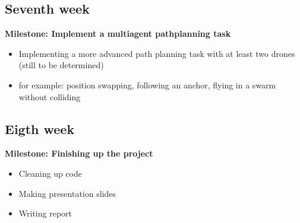 \documentclass{article}
\begin{document}
\subsection{Seventh week}
\textbf{Milestone: Implement a multiagent pathplanning task}
\begin{itemize}
    \item Implementing a more advanced path planning task with at least two drones (still to be determined)
    \item for example: position swapping, following an anchor, flying in a swarm without colliding
\end{itemize}

\subsection{Eigth week}
\textbf{Milestone: Finishing up the project}
\begin{itemize}
    \item Cleaning up code
    \item Making presentation slides
    \item Writing report
\end{itemize}
\end{document}
